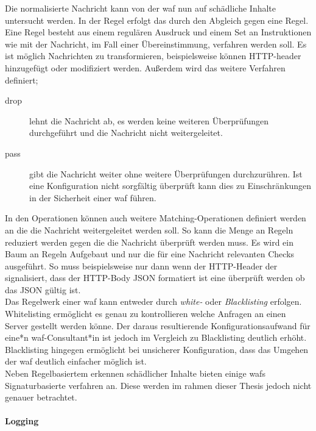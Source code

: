 Die normalisierte Nachricht kann von der \ac{waf} nun auf schädliche Inhalte untersucht werden.
In der Regel erfolgt das durch den Abgleich gegen eine Regel.
Eine Regel besteht aus einem regulären Ausdruck und einem Set an Instruktionen wie mit der Nachricht, im Fall einer Übereinstimmung, verfahren werden soll.
Es ist möglich Nachrichten zu transformieren, beispielsweise können HTTP-header hinzugefügt oder modifiziert werden.
Außerdem wird das weitere Verfahren definiert;

\begin{description}
    \item[drop] lehnt die Nachricht ab, es werden keine weiteren Überprüfungen durchgeführt und die Nachricht nicht weitergeleitet.
    \item[pass] gibt die Nachricht weiter ohne weitere Überprüfungen durchzurühren.
    Ist eine Konfiguration nicht sorgfältig überprüft kann dies zu Einschränkungen in der Sicherheit einer \ac{waf} führen.
\end{description}

In den Operationen können auch weitere Matching-Operationen definiert werden an die die Nachricht weitergeleitet werden soll.
So kann die Menge an Regeln reduziert werden gegen die die Nachricht überprüft werden muss.
Es wird ein Baum an Regeln Aufgebaut und nur die für eine Nachricht relevanten Checks ausgeführt.
So muss beispielsweise nur dann wenn der HTTP-Header der signalisiert, dass der HTTP-Body JSON formatiert ist eine überprüft werden ob das JSON gültig ist.\\

Das Regelwerk einer \ac{waf} kann entweder durch \textit{white-} oder \textit{Blacklisting} erfolgen.
Whitelisting ermöglicht es genau zu kontrollieren welche Anfragen an einen Server gestellt werden könne.
Der daraus resultierende Konfigurationsaufwand für eine*n \ac{waf}-Consultant*in ist jedoch im Vergleich zu Blacklisting deutlich erhöht.
Blacklisting hingegen ermöglicht bei unsicherer Konfiguration, dass das Umgehen der \ac{waf} deutlich einfacher möglich ist.\\

Neben Regelbasiertem erkennen schädlicher Inhalte bieten einige \acp{waf} Signaturbasierte verfahren an.
Diese werden im rahmen dieser Thesis jedoch nicht genauer betrachtet.

\paragraph{Logging}

